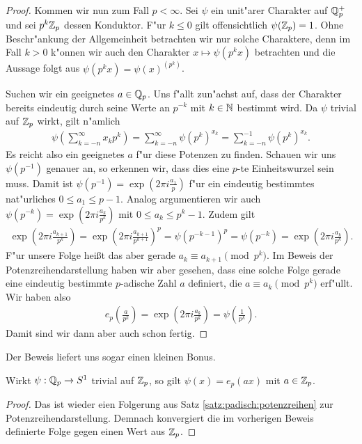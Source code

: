\begin{proof}
			Kommen wir nun zum Fall $p<\infty$. 
			Sei $\psi$ ein unit"arer Charakter auf $\mathbb{Q}_p^+$ und sei $p^k{\mathbb{Z}_p}$ dessen Konduktor.
			F"ur $k\leq0$ gilt offensichtlich $\psi({\mathbb{Z}_p})=1$.
			Ohne Beschr"ankung der Allgemeinheit betrachten wir nur solche Charaktere, denn im Fall $k>0$ k"onnen wir auch den Charakter $x\mapsto \psi(p^kx)$ betrachten und die Aussage folgt aus $\psi(p^kx) = \psi(x)^{(p^k)}$.
			
			Suchen wir ein geeignetes $a\in{\mathbb{Q}_p}$. 
			Uns f"allt zun"achst auf, dass der Charakter bereits eindeutig durch seine Werte an $p^{-k}$ mit $k \in \mathbb{N}$ bestimmt wird.
			Da $\psi$ trivial auf ${\mathbb{Z}_p}$ wirkt, gilt n"amlich
			\begin{align*}
				\psi \left( \sum_{k=-n}^\infty x_k p^k \right) = \sum_{k=-n}^{\infty} \psi \left(p^k \right)^{x_k} = \sum_{k=-n}^{-1} \psi \left(p^k \right)^{x_k}.
			\end{align*}
			Es reicht also ein geeignetes $a$ f"ur diese Potenzen zu finden.
			Schauen wir uns $\psi(p^{-1})$ genauer an, so erkennen wir, dass dies eine $p$-te Einheitswurzel sein muss.
			Damit ist $\psi(p^{-1}) = \exp(2\pi i \frac{a_1}{p})$ f"ur ein eindeutig bestimmtes nat"urliches $0\leq a_1 \leq p - 1$.
			Analog argumentieren wir auch $\psi(p^{-k}) = \exp(2\pi i \frac{a_k}{p^k})$ mit $0\leq a_k \leq p^k - 1$.
			Zudem gilt 
			\begin{align*}
				\exp\left(2\pi i \frac{a_{k+1}}{p^{k}}\right) = \exp\left(2\pi i \frac{a_{k+1}}{p^{k+1}}\right)^{p}= \psi(p^{-k-1})^p = \psi(p^{-k}) = \exp\left(2\pi i \frac{a_k}{p^k}\right).
			\end{align*}
			F"ur unsere Folge heißt das aber gerade $a_k \equiv a_{k+1} \pmod{p^k}$.
			Im Beweis der Potenzreihendarstellung haben wir aber gesehen, dass eine solche Folge gerade eine eindeutig bestimmte $p$-adische Zahl $a$ definiert, die $a \equiv a_k \pmod{p^k}$ erf"ullt.
			Wir haben also
			\begin{align*}
				e_p\left( \frac{a}{p^{k}} \right) = \exp\left( 2\pi i \frac{a_k}{p^k} \right) = \psi \left( \frac{1}{p^k} \right).
			\end{align*}
			Damit sind wir dann aber auch schon fertig.
		\end{proof}
		Der Beweis liefert uns sogar einen kleinen Bonus.
		\begin{korollar}\label{kor:lokal:charTrivialZp}
			Wirkt $\psi:{\mathbb{Q}_p}\to S^1$ trivial auf ${\mathbb{Z}_p}$, so gilt $\psi(x) = e_p(ax)$ mit $a\in {\mathbb{Z}_p}$.
		\end{korollar}
		\begin{proof}
			Das ist wieder eien Folgerung aus Satz \ref{satz:padisch:potenzreihen} zur Potenzreihendarstellung.
			Demnach konvergiert die im vorherigen Beweis definierte Folge gegen einen Wert aus ${\mathbb{Z}_p}$.
		\end{proof}
		
